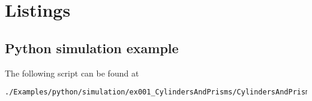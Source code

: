 

\chapter{Listings}

%
\section{Python simulation example} \label{PythonSimulationExampleScript}
The following script can be found at
\begin{lstlisting}[language=shell, style=commandline]
./Examples/python/simulation/ex001_CylindersAndPrisms/CylindersAndPrisms.py
\end{lstlisting}


